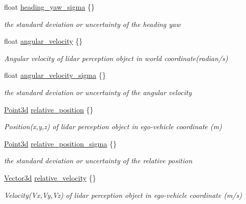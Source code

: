 \begin{DoxyCompactItemize}
float \hyperlink{structmaf__perception__interface_1_1LidarPerceptionObjectData_ab948118698cdc885c0cac10cbe0c9abb}{heading\+\_\+yaw\+\_\+sigma} \{\}
\begin{DoxyCompactList}\small\item\em the standard deviation or uncertainty of the heading yaw \end{DoxyCompactList}\item 
float \hyperlink{structmaf__perception__interface_1_1LidarPerceptionObjectData_a2b62752c9e6cb91089539df4ac9e1d95}{angular\+\_\+velocity} \{\}
\begin{DoxyCompactList}\small\item\em Angular velocity of lidar perception object in world coordinate(radian/s) \end{DoxyCompactList}\item 
float \hyperlink{structmaf__perception__interface_1_1LidarPerceptionObjectData_a2618cc7a1bbe398bedc470106c57d080}{angular\+\_\+velocity\+\_\+sigma} \{\}
\begin{DoxyCompactList}\small\item\em the standard deviation or uncertainty of the angular velocity \end{DoxyCompactList}\item 
\hyperlink{structmaf__perception__interface_1_1Point3d}{Point3d} \hyperlink{structmaf__perception__interface_1_1LidarPerceptionObjectData_a77aacd754c08a3de60d463efce691324}{relative\+\_\+position} \{\}
\begin{DoxyCompactList}\small\item\em Position(x,y,z) of lidar perception object in ego-\/vehicle coordinate (m) \end{DoxyCompactList}\item 
\hyperlink{structmaf__perception__interface_1_1Point3d}{Point3d} \hyperlink{structmaf__perception__interface_1_1LidarPerceptionObjectData_a723e6eba9b09902ee051dd6c7f0cbee9}{relative\+\_\+position\+\_\+sigma} \{\}
\begin{DoxyCompactList}\small\item\em the standard deviation or uncertainty of the relative position \end{DoxyCompactList}\item 
\hyperlink{structmaf__perception__interface_1_1Vector3d}{Vector3d} \hyperlink{structmaf__perception__interface_1_1LidarPerceptionObjectData_aa33e7a11a7d46db9f28fddd635e3b454}{relative\+\_\+velocity} \{\}
\begin{DoxyCompactList}\small\item\em Velocity(\+Vx,\+Vy,\+Vz) of lidar perception object in ego-\/vehicle coordinate (m/s) \end{DoxyCompactList}\item 

\end{DoxyCompactItemize}
